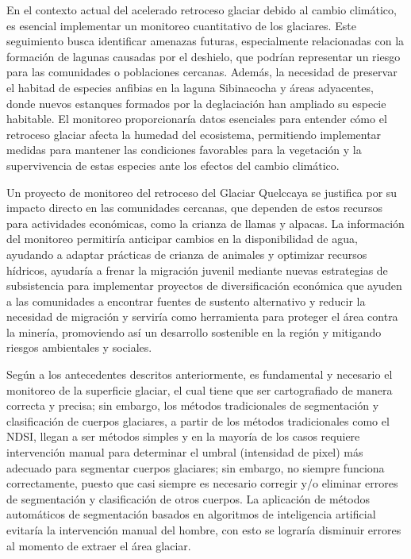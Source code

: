 En el contexto actual del acelerado retroceso glaciar debido al cambio climático, es esencial implementar un monitoreo cuantitativo de los glaciares. Este seguimiento busca identificar amenazas futuras, especialmente relacionadas con la formación de lagunas causadas por el deshielo, que podrían representar un riesgo para las comunidades o poblaciones cercanas. Además, la necesidad de preservar el habitad de especies anfibias en la laguna Sibinacocha y áreas adyacentes, donde nuevos estanques formados por la deglaciación han ampliado su especie habitable. El monitoreo proporcionaría datos esenciales para entender cómo el retroceso glaciar afecta la humedad del ecosistema, permitiendo implementar medidas para mantener las condiciones favorables para la vegetación y la supervivencia de estas especies ante los efectos del cambio climático.

Un proyecto de monitoreo del retroceso del Glaciar Quelccaya se justifica por su impacto directo en las comunidades cercanas, que dependen de estos recursos para actividades económicas, como la crianza de llamas y alpacas. La información del monitoreo permitiría anticipar cambios en la disponibilidad de agua, ayudando a adaptar prácticas de crianza de animales y optimizar recursos hídricos, ayudaría a frenar la migración juvenil mediante nuevas estrategias de subsistencia para implementar proyectos de diversificación económica que ayuden a las comunidades a encontrar fuentes de sustento alternativo y reducir la necesidad de migración y serviría como herramienta para proteger el área contra la minería, promoviendo así un desarrollo sostenible en la región y mitigando riesgos ambientales y sociales.

Según a los antecedentes descritos anteriormente, es fundamental y necesario el monitoreo de la superficie glaciar, el cual tiene que ser cartografiado de manera correcta y precisa; sin embargo, los métodos tradicionales de segmentación y clasificación de cuerpos glaciares, a partir de los métodos tradicionales como el NDSI, llegan a ser métodos simples y en la mayoría de los casos requiere intervención manual para determinar el umbral (intensidad de pixel) más adecuado para segmentar cuerpos glaciares; sin embargo, no siempre funciona correctamente, puesto que casi siempre es necesario corregir y/o eliminar errores de segmentación y clasificación de otros cuerpos. La aplicación de métodos automáticos de segmentación basados en algoritmos de inteligencia artificial evitaría la intervención manual del hombre, con esto se lograría disminuir errores al momento de extraer el área glaciar. 

